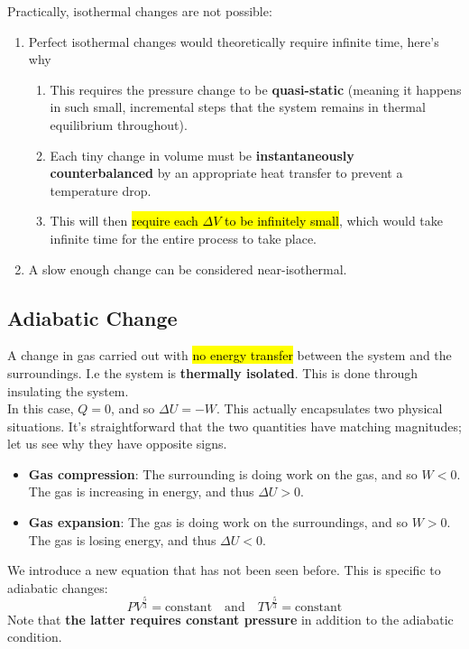 \documentclass[a4paper,12pt]{article}
\newcommand{\eqand}{\quad \text{and} \quad}
\newcommand{\lb}{\\[8pt]}
\begin{document}
\pagebreak

Practically, isothermal changes are not possible:
\begin{enumerate}
  \item Perfect isothermal changes would theoretically require infinite time, here's why
        \begin{enumerate}
          \item This requires the pressure change to be \textbf{quasi-static} (meaning it happens in such small, incremental steps that the system remains in thermal equilibrium throughout).
          \item Each tiny change in volume must be \textbf{instantaneously counterbalanced} by an appropriate heat transfer to prevent a temperature drop.
          \item This will then \hl{require each $\Delta V$ to be infinitely small}, which would take infinite time for the entire process to take place.
        \end{enumerate}
  \item A slow enough change can be considered near-isothermal.
\end{enumerate}

\subsection{Adiabatic Change}

A change in gas carried out with \hl{no energy transfer} between the system and the surroundings. I.e the system is \textbf{thermally isolated}. This is done through insulating the system.\lb
In this case, $Q = 0$, and so $\Delta U = -W$. This actually encapsulates two physical situations. It's straightforward that the two quantities have matching magnitudes; let us see why they have opposite signs.
\begin{itemize}
  \item \textbf{Gas compression}: The surrounding is doing work on the gas, and so $W < 0$. The gas is increasing in energy, and thus $\Delta U > 0$.
  \item \textbf{Gas expansion}: The gas is doing work on the surroundings, and so $W > 0$. The gas is losing energy, and thus $\Delta U < 0$.
\end{itemize}

We introduce a new equation that has not been seen before. This is specific to adiabatic changes:
\begin{equation}\label{eq:adiabatic}
  PV^{\frac{5}{3}} = \text{constant} \eqand TV^{\frac{5}{3}} = \text{constant}
\end{equation}
Note that \textbf{the latter requires constant pressure} in addition to the adiabatic condition.
\end{document}
